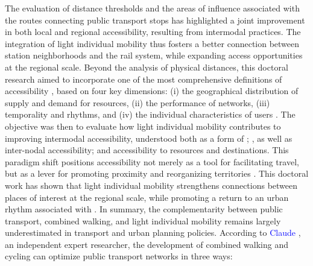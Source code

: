 \begin{refsegment}
The evaluation of distance thresholds and the areas of influence associated with the routes connecting public transport stops has highlighted a joint improvement in both local and regional accessibility, resulting from intermodal practices. The integration of light individual mobility thus fosters a better connection between station neighborhoods and the rail system, while expanding access opportunities at the regional scale. Beyond the analysis of physical distances, this doctoral research aimed to incorporate one of the most comprehensive definitions of accessibility \textcolor{blue}{\autocite[3]{chapelon_accessibilite_2006}}, based on four key dimensions: (i) the geographical distribution of supply and demand for resources, (ii) the performance of networks, (iii) temporality and rhythms, and (iv) the individual characteristics of users \textcolor{blue}{\autocite[128]{geurs_accessibility_2004}}. The objective was then to evaluate how light individual mobility contributes to improving intermodal accessibility, understood both as a form of  \textcolor{blue}{\autocite[2]{silva_proximity-centred_2023}};  \textcolor{blue}{\autocite[283-343]{chapelon_offre_1997}}, as well as inter-nodal accessibility; and accessibility to resources and destinations. This paradigm shift positions accessibility not merely as a tool for facilitating travel, but as a lever for promoting proximity and reorganizing territories \textcolor{blue}{\autocite[4]{levine_century_2020}}. This doctoral work has shown that light individual mobility strengthens connections between places of interest at the regional scale, while promoting a return to an urban rhythm associated with  \textcolor{blue}{\autocite[9]{silva_proximity-centred_2023}}. In summary, the complementarity between public transport, combined walking, and light individual mobility remains largely underestimated in transport and urban planning policies. According to \textcolor{blue}{Claude} \textcolor{blue}{\textcite[6-7]{soulas_triptyque_2021}}, an independent expert researcher, the development of combined walking and cycling can optimize public transport networks in three ways:

\end{refsegment}
